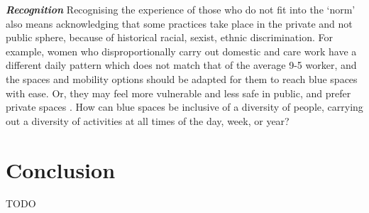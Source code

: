 \documentclass{article}
\newcommand{\bisection}[1]{\textbf{\textit{#1}}}
\begin{document}
\bisection{Recognition}
Recognising the experience of those who do not fit into the `norm' also means acknowledging that some practices take place in the private and not public sphere, because of historical racial, sexist, ethnic discrimination. For example, women who disproportionally carry out domestic and care work have a different daily pattern which does not match that of the average 9-5 worker, and the spaces and mobility options should be adapted for them to reach blue spaces with ease. Or, they may feel more vulnerable and less safe in public, and prefer private spaces \parencite{wessells2014urban}. How can blue spaces be inclusive of a diversity of people, carrying out a diversity of activities at all times of the day, week, or year? 


\section{Conclusion}

TODO

\printbibliography
\end{document}
